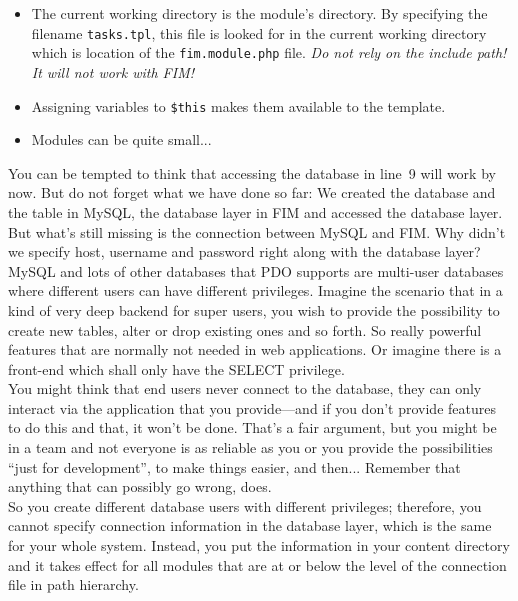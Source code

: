 \documentclass{scrartcl}
\begin{document}
\begin{itemize}
\begin{multicols}{2}
               \begin{Verbatim}[commandchars=\\\{\},codes={\catcode`$=3},fontsize=\scriptsize]
fim:///path  $\leftrightarrow$ //path
fim://path   $\leftrightarrow$ /path
fim://./path $\leftrightarrow$ path
             $\leftrightarrow$ ./path
               \end{Verbatim}
            \end{multicols}
         \item
            The current working directory is the module's directory. By specifying the filename \texttt{tasks.tpl}, this file is looked for in the current working directory which is location of the \texttt{fim.module.php} file. \emph{Do not rely on the include path! It will not work with FIM!}
         \item
            Assigning variables to \lstinline!$this! makes them available to the template.
         \item
            Modules can be quite small...
      \end{itemize}
      You can be tempted to think that accessing the database in line~9 will work by now. But do not forget what we have done so far: We created the database and the table in MySQL, the database layer in FIM and accessed the database layer. But what's still missing is the connection between MySQL and FIM. Why didn't we specify host, username and password right along with the database layer? \\
      MySQL and lots of other databases that PDO supports are multi-user databases where different users can have different privileges. Imagine the scenario that in a kind of very deep backend for super users, you wish to provide the possibility to create new tables, alter or drop existing ones and so forth. So really powerful features that are normally not needed in web applications. Or imagine there is a front-end which shall only have the SELECT privilege. \\
      You might think that end users never connect to the database, they can only interact via the application that you provide---and if you don't provide features to do this and that, it won't be done. That's a fair argument, but you might be in a team and not everyone is as reliable as you or you provide the possibilities ``just for development'', to make things easier, and then... Remember that anything that can possibly go wrong, does. \\
      So you create different database users with different privileges; therefore, you cannot specify connection information in the database layer, which is the same for your whole system. Instead, you put the information in your content directory and it takes effect for all modules that are at or below the level of the connection file in path hierarchy. \\
\end{document}
